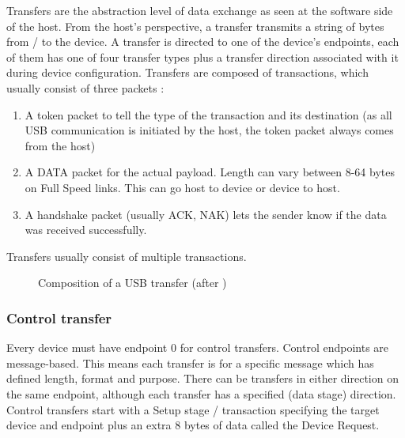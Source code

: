 \documentclass{article}
\begin{document}
Transfers are the abstraction level of data exchange as seen at the software
side of the host. From the host's perspective, a transfer transmits a string of
 bytes from / to the device. A transfer is directed to one of the device's endpoints,
each of them has one of four transfer types plus a transfer direction
associated with it during device configuration.
Transfers are composed of transactions, which usually consist of three
packets \cite[p. 209ff.]{usbstd}:

\begin{enumerate}
  \item A token packet to tell the type of the transaction and its destination
        (as all USB communication is initiated by the host, the token packet always comes
        from the host)
  \item A DATA packet for the actual payload. Length can vary between 8-64 bytes on Full Speed links.
        This can go host to device or device to host.
  \item A handshake packet (usually ACK, NAK) lets the sender know if the data was received successfully.
\end{enumerate}

Transfers usually consist of multiple transactions.

\begin{figure}[H]
  \caption{Composition of a USB transfer (after \cite[p. 44]{uc})}
  \centering
  \scalebox{1}{}
\end{figure}

\subsubsection {Control transfer}

Every device must have endpoint 0 for control transfers. Control endpoints
are message-based. This means each transfer is for a specific message which has
defined length, format and purpose. There can be transfers in either direction
on the same endpoint, although each transfer has a specified (data stage) direction.
Control transfers start with a Setup stage / transaction specifying the target device
and endpoint plus an extra 8 bytes of data called the Device Request. \cite[p. 38f.]{usbstd}
\end{document}
